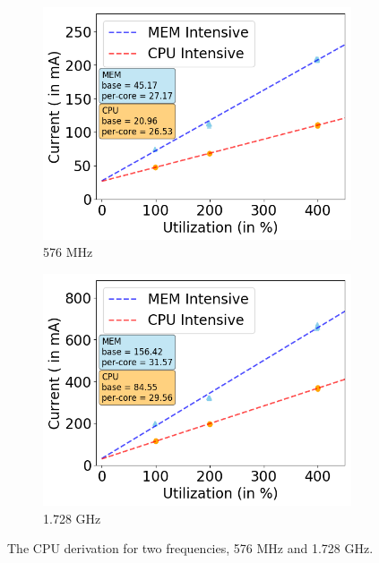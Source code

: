 \begin{figure}[tp]
    \centering
    \vspace{-0.1in}
         \begin{subfigure}[b]{0.49\columnwidth}
         \centering
         \includegraphics[width=\textwidth]{figures/576000.png}
         \caption{576 MHz}
         \label{fig:cpu_576000}
    \end{subfigure}
    \hfill
    \begin{subfigure}[b]{0.49\columnwidth}
         \centering
         \includegraphics[width=\textwidth]{figures/1728000.png}
         \caption{1.728 GHz}
         \label{fig:cpu_1728000}
    \end{subfigure}
    \caption{The CPU derivation for two frequencies, 576 MHz and 1.728 GHz.}
    \label{fig:cpu_model_derivation}
    \vspace{-0.1in}
\end{figure}
\fi


